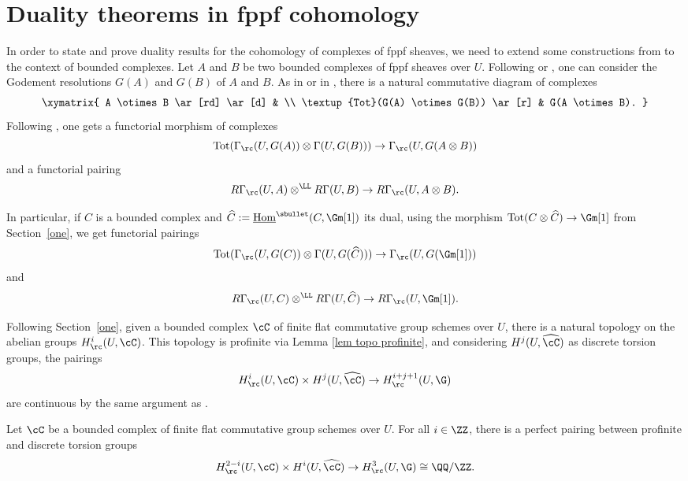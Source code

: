 \section{Duality theorems in fppf cohomology} \label{two}

In order to state and prove duality results for the cohomology of complexes of fppf sheaves, we need to extend some constructions from \cite{DemH} to the context of bounded complexes.
Let $A$ and $B$ be two bounded complexes of fppf sheaves over $U$. Following \cite[XVII,\,4.2.9]{SGA4} or \cite[App.\,A]{friedsus}, one can consider the Godement resolutions $G(A)$ and $G(B)$ of $A$ and $B$. As in \cite[II.6.6]{God} or in \cite[App.\,A]{friedsus}, there is a natural commutative diagram of complexes
\[
\xymatrix{
A \otimes B \ar[rd] \ar[d] & \\
\textup{Tot}(G(A) \otimes G(B)) \ar[r] & G(A \otimes B).
}
\]
Following \cite[Proof of Lem.\,4.1]{DemH}, one gets a functorial morphism of complexes
\begin{equation} \label{cup complexes}
\textup{Tot}(\Gamma_\rc(U, G(A)) \otimes \Gamma(U,G(B))) \to \Gamma_\rc(U,G(A \otimes B))
\end{equation}
and a functorial pairing
\[
R\Gamma_\rc(U,A) \otimes^{\LL} R\Gamma(U,B) \to R\Gamma_\rc(U,A \otimes B).
\]

In particular, if $C$ is a bounded complex and $\widehat{C}:= \underline{\textup{Hom}}^\sbullet(C, \Gm[1])$ its dual, using the morphism $\textup{Tot}(C \otimes \widehat{C}) \to \Gm[1]$ from Section~\ref{one}, we get functorial pairings
\[\textup{Tot}(\Gamma_\rc(U, G(C)) \otimes \Gamma(U,G(\widehat{C}))) \to \Gamma_\rc(U,G(\Gm[1]))
\]
and
\begin{equation} \label{pairing derived}
R\Gamma_\rc(U,C) \otimes^{\LL} R\Gamma(U,\widehat{C}) \to R\Gamma_\rc(U,\Gm[1]).
\end{equation}

Following Section~\ref{one}, given a bounded complex $\cC$ of finite flat commutative group schemes over $U$, there is a natural topology on the abelian groups $H^i_\rc(U, \cC)$. This topology is profinite via Lemma \ref{lem topo profinite}, and considering $H^j(U, \widehat{\cC})$ as discrete torsion groups, the pairings
\[
H^i_\rc(U, \cC) \times H^j(U, \widehat{\cC}) \to H^{i+j+1}_\rc(U, \G)
\]
are continuous by the same argument as \cite[Lem.\,4.4]{DemH}.

\begin{prop} \label{AMM complex}
Let $\cC$ be a bounded complex of finite flat commutative group schemes over $U$.
For all $i \in \ZZ$, there is a perfect pairing between profinite and discrete torsion groups\vspace*{-3pt}
\[
H^{2-i}_\rc(U, \cC) \times H^i(U, \widehat{\cC}) \to H^3_\rc(U,\G) \cong \QQ/\ZZ.
\]
\end{prop}

